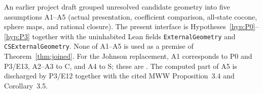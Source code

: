 \begin{remark}\label{sec:retired-assumptions}
An earlier project draft grouped unresolved candidate geometry into five
assumptions A1--A5 (actual presentation, coefficient comparison, all-state
cocone, sphere maps, and rational closure).  The present interface is
Hypotheses~\ref{hyp:P0}--\ref{hyp:P3} together with the uninhabited Lean
fields \texttt{ExternalGeometry} and \texttt{CSExternalGeometry}.  None of
A1--A5 is used as a premise of Theorem~\ref{thm:joined}.  For the Johnson
replacement, A1 corresponds to P0 and P3/E13, A2--A3 to C, and A4 to S;
these are \Open.  The computed part of A5 is discharged by P3/E12 together
with the cited MWW Proposition~3.4 and Corollary~3.5.
\end{remark}

